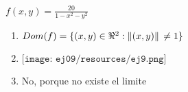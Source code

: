 \documentclass[../practica_03.tex]{subfiles}
\begin{document}
    $ f(x,y) = \frac{20}{1-x^2-y^2} $

    \begin{enumerate}
        \item

            $ Dom(f) = \{ (x,y) \in \real^2 : \norm*{(x,y)} \neq 1 \} $

        \item

            $ \texttt{[image: ej09/resources/ej9.png]}  $

        \item
    
            No, porque no existe el limite
    
    \end{enumerate}
\end{document}
